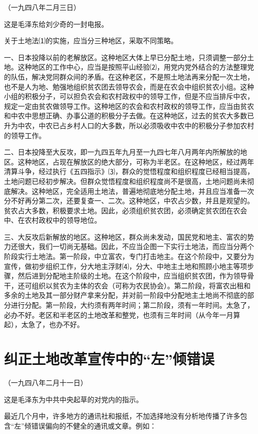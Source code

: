 \documentclass[UTF-8, a5paper, 12pt]{ctexart}
\begin{document}
（一九四八年二月三日）

这是毛泽东给刘少奇的一封电报。

关于土地法⑴的实施，应当分三种地区，采取不同策略。

一、日本投降以前的老解放区。这种地区大体上早已分配土地，只须调整一部分土地。这种地区的工作中心，应当是按照平山经验⑵，用党内党外结合的方法整理党的队伍，解决党同群众间的矛盾。在这种老区，不是照土地法再来分配一次土地，也不是人为地、勉强地组织贫农团去领导农会，而是在农会中组织贫农小组。这种小组的积极分子，可以担负农会和农村政权中的领导工作，但是不应当排斥中农，规定一定由贫农做领导工作。这种地区的农会和农村政权的领导工作，应当由贫农和中农中思想正确、办事公道的积极分子去做。在这种地区，过去的贫农大多数已升为中农，中农已占乡村人口的大多数，所以必须吸收中农中的积极分子参加农村的领导工作。

二、日本投降至大反攻，即一九四五年九月至一九四七年八月两年内所解放的地区。这种地区，占现在解放区的绝大部分，可称为半老区。在这种地区，经过两年清算斗争，经过执行《五四指示》⑶，群众的觉悟程度和组织程度已经相当提高，土地问题已经初步解决。但群众觉悟程度和组织程度尚不是很高，土地问题尚未彻底解决。这种地区，完全适用土地法，普遍地彻底地分配土地，并且应当准备一次分不好再分第二次，还要复查一、二次。这种地区，中农占少数，并且是观望的。贫农占大多数，积极要求土地。因此，必须组织贫农团，必须确定贫农团在农会中、在农村政权中的领导地位。

三、大反攻后新解放的地区。这种地区，群众尚未发动，国民党和地主、富农的势力还很大，我们一切尚无基础。因此，不应当企图一下实行土地法，而应当分两个阶段实行土地法。第一阶段，中立富农，专门打击地主。在这个阶段中，又要分为宣传，做初步组织工作，分大地主浮财⑷，分大、中地主土地和照顾小地主等项步骤，然后进到分配地主阶级的土地。在这个阶段中，应当组织贫农团，作为领导骨干，还可组织以贫农为主体的农会（可称为农民协会）。第二阶段，将富农出租和多余的土地及其一部分财产拿来分配，并对前一阶段中分配地主土地尚不彻底的部分进行分配。第一阶段，大约须有两年时间；第二阶段，须有一年时间。太急了，必办不好。老区和半老区的土地改革和整党，也须有三年时间（从今年一月算起），太急了，也办不好。


\section{纠正土地改革宣传中的“左”倾错误}

（一九四八年二月十一日）

这是毛泽东为中共中央起草的对党内的指示。

最近几个月中，许多地方的通讯社和报纸，不加选择地没有分析地传播了许多包含“左”倾错误偏向的不健全的通讯或文章。例如：
\end{document}
